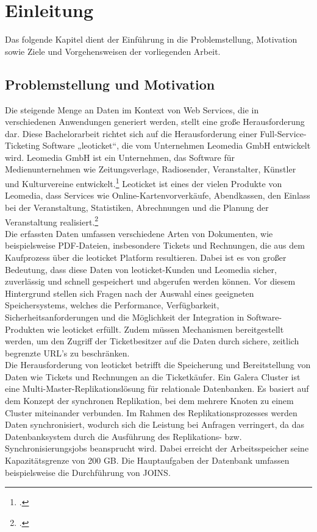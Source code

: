 \chapter{Einleitung}

Das folgende Kapitel dient der Einführung in die Problemstellung, Motivation sowie Ziele und Vorgehensweisen der vorliegenden Arbeit.

\section{Problemstellung und Motivation}

Die steigende Menge an Daten im Kontext von Web Services, die in verschiedenen Anwendungen generiert werden, stellt eine große Herausforderung dar. Diese Bachelorarbeit richtet sich auf die Herausforderung einer Full-Service-Ticketing Software „leoticket“, die vom Unternehmen Leomedia GmbH entwickelt wird. 
Leomedia GmbH ist ein Unternehmen, das Software für Medienunternehmen wie Zeitungsverlage, Radiosender, Veranstalter, Künstler und Kulturvereine entwickelt.\footcite{leomedia-web} 
Leoticket ist eines der vielen Produkte von Leomedia, dass Services wie Online-Kartenvorverkäufe, Abendkassen, den Einlass bei der Veranstaltung, Statistiken, Abrechnungen und die Planung der Veranstaltung realisiert.\footcite{leomedia-web}\\ 

Die erfassten Daten umfassen verschiedene Arten von Dokumenten, wie beispielsweise PDF-Dateien, insbesondere Tickets und Rechnungen, die aus dem Kaufprozess über die leoticket Platform resultieren. Dabei ist es von großer Bedeutung, dass diese Daten von leoticket-Kunden und Leomedia sicher, zuverlässig und schnell gespeichert und abgerufen werden können. Vor diesem Hintergrund stellen sich Fragen nach der Auswahl eines geeigneten Speichersystems, welches die Performance, Verfügbarkeit, Sicherheitsanforderungen und die Möglichkeit der Integration in Software-Produkten wie leoticket erfüllt. Zudem müssen Mechanismen bereitgestellt werden, um den Zugriff der Ticketbesitzer auf die Daten durch sichere, zeitlich begrenzte URL’s zu beschränken.\\

Die Herausforderung von leoticket betrifft die Speicherung und Bereitstellung von Daten wie Tickets und Rechnungen an die Ticketkäufer. Ein Galera Cluster ist eine Multi-Master-Replikationslösung für relationale Datenbanken. Es basiert auf dem Konzept der synchronen Replikation, bei dem mehrere Knoten zu einem Cluster miteinander verbunden. 
Im Rahmen des Replikationsprozesses werden Daten synchronisiert, wodurch sich die Leistung bei Anfragen verringert, da das Datenbanksystem durch die Ausführung des Replikations- bzw. Synchronisierungsjobs beansprucht wird. Dabei erreicht der Arbeitsspeicher seine Kapazitätsgrenze von 200 GB. Die Hauptaufgaben der Datenbank umfassen beispielsweise die Durchführung von JOINS.\\ 

